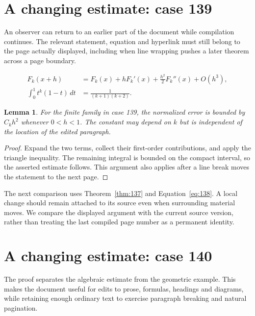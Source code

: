 \documentclass[a4paper,10pt]{article}
\newtheorem{lemma}[theorem]{Lemma}
\begin{document}
\lipsum[13]

\section{A changing estimate: case 139}\label{unit:138}
An observer can return to an earlier part of the document while compilation continues. The relevant statement, equation and hyperlink must still belong to the page actually displayed, including when line wrapping pushes a later theorem across a page boundary.

\lipsum[25-26]
\begin{align}\label{eq:138}
 F_k(x+h)&=F_k(x)+hF_k'(x)+\frac{h^2}{2}F_k''(x)+O(h^3),\\
 \int_0^1 t^k(1-t)\,dt&=\frac{1}{(k+1)(k+2)}.
\end{align}
\begin{lemma}\label{thm:138}
For the finite family in case 139, the normalized error is bounded by $C_k h^2$ whenever $0<h<1$. The constant may depend on $k$ but is independent of the location of the edited paragraph.
\end{lemma}
\begin{proof}
Expand the two terms, collect their first-order contributions, and apply the
triangle inequality. The remaining integral is bounded on the compact interval,
so the asserted estimate follows. This argument also applies after a line break
moves the statement to the next page.
\end{proof}
The next comparison uses Theorem~\ref{thm:137} and Equation~\ref{eq:138}. A local change should remain attached to its source even when surrounding material moves. We compare the displayed argument with the current source version, rather than treating the last compiled page number as a permanent identity.

\lipsum[18]

\section{A changing estimate: case 140}\label{unit:139}
The proof separates the algebraic estimate from the geometric example. This makes the document useful for edits to prose, formulas, headings and diagrams, while retaining enough ordinary text to exercise paragraph breaking and natural pagination.
\end{document}
